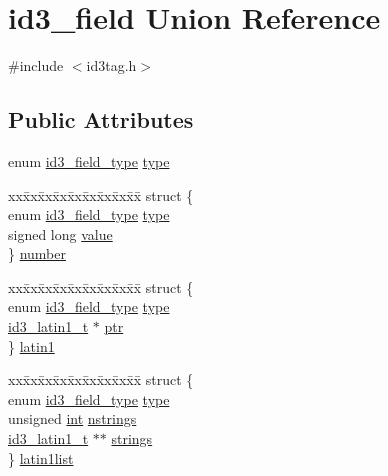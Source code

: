\hypertarget{unionid3__field}{}\section{id3\+\_\+field Union Reference}
\label{unionid3__field}


{\ttfamily \#include $<$id3tag.\+h$>$}

\subsection*{Public Attributes}
\begin{DoxyCompactItemize}
\item 
enum \hyperlink{id3tag_8h_a0cb7be9ff485c843c1b69600f5c83d41}{id3\+\_\+field\+\_\+type} \hyperlink{unionid3__field_a3fd3df5b89abdcfc671708c145564c75}{type}
\item 
\begin{tabbing}
xx\=xx\=xx\=xx\=xx\=xx\=xx\=xx\=xx\=\kill
struct \{\\
\>enum \hyperlink{id3tag_8h_a0cb7be9ff485c843c1b69600f5c83d41}{id3\_field\_type} \hyperlink{unionid3__field_a3fd3df5b89abdcfc671708c145564c75}{type}\\
\>signed long \hyperlink{unionid3__field_ade4486e524b5bd80a0833f26e6868392}{value}\\
\} \hyperlink{unionid3__field_a19a3acc70277180a9399554cb0b6d642}{number}\\

\end{tabbing}\item 
\begin{tabbing}
xx\=xx\=xx\=xx\=xx\=xx\=xx\=xx\=xx\=\kill
struct \{\\
\>enum \hyperlink{id3tag_8h_a0cb7be9ff485c843c1b69600f5c83d41}{id3\_field\_type} \hyperlink{unionid3__field_a3fd3df5b89abdcfc671708c145564c75}{type}\\
\>\hyperlink{id3tag_8h_a1d94ff20dfae456014090b3c0fc80749}{id3\_latin1\_t} $\ast$ \hyperlink{unionid3__field_a623cefbabc200ba84aa1d662b74e23a5}{ptr}\\
\} \hyperlink{unionid3__field_ab4d98b07661c0f05bab1878360c4dfeb}{latin1}\\

\end{tabbing}\item 
\begin{tabbing}
xx\=xx\=xx\=xx\=xx\=xx\=xx\=xx\=xx\=\kill
struct \{\\
\>enum \hyperlink{id3tag_8h_a0cb7be9ff485c843c1b69600f5c83d41}{id3\_field\_type} \hyperlink{unionid3__field_a3fd3df5b89abdcfc671708c145564c75}{type}\\
\>unsigned \hyperlink{xmltok_8h_a5a0d4a5641ce434f1d23533f2b2e6653}{int} \hyperlink{unionid3__field_a4dcaa7d27cb676c7b3450084131a68db}{nstrings}\\
\>\hyperlink{id3tag_8h_a1d94ff20dfae456014090b3c0fc80749}{id3\_latin1\_t} $\ast$$\ast$ \hyperlink{unionid3__field_aa15b7e30355a3f3ac9272bac985039f7}{strings}\\
\} \hyperlink{unionid3__field_aa7a9819cbd3e23976e1fc6490709a38b}{latin1list}\\


\end{tabbing}
\end{DoxyCompactItemize}
